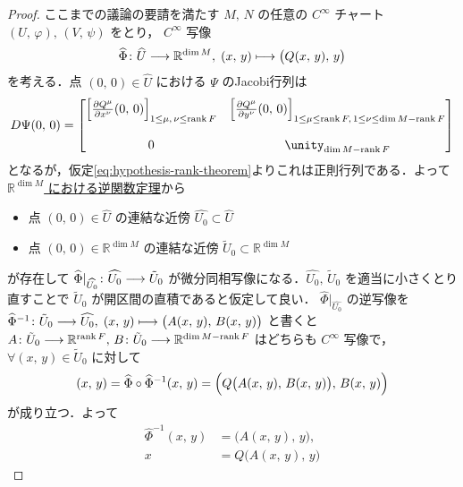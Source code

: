 \documentclass[TQFT_main]{subfiles}
\begin{document}
\begin{proof}
    ここまでの議論の要請を満たす $M,\, N$ の任意の $C^\infty$ チャート $(U,\, \varphi),\, (V,\, \psi)$ をとり， 
    $C^\infty$ 写像
    \begin{align}
        \widehat{\Phi} \colon \widehat{U} \longrightarrow \mathbb{R}^{\dim M},\; (x,\, y) \longmapsto \bigl( Q(x,\, y),\, y \bigr) 
    \end{align}
    を考える．点 $(0,\, 0) \in \widehat{U}$ における $\Psi$ のJacobi行列は
    \begin{align}
        D\Psi(0,\, 0) = 
        \mqty[
            \left[\pdv{Q^\mu}{x^\nu}()(0,\, 0)\right]_{1 \le \mu,\, \nu \le \rank F} & \left[\pdv{Q^\mu}{y^\nu}()(0,\, 0)\right]_{1 \le \mu \le \rank F,\, 1 \le \nu \le \dim M - \rank F} \\ 
            & \\
            0 & \unity_{\dim M - \rank F}
        ]
    \end{align}
    となるが，仮定\eqref{eq:hypothesis-rank-theorem}よりこれは正則行列である．よって\hyperref[thm:inverse-function-Rn]{$\mathbb{R}^{\dim M}$ における逆関数定理}から
    \begin{itemize}
        \item 点 $(0,\, 0) \in \widehat{U}$ の連結な近傍 $\widehat{U_0} \subset \widehat{U}$
        \item 点 $(0,\, 0) \in \mathbb{R}^{\dim M}$ の連結な近傍 $\tilde{U}_0 \subset \mathbb{R}^{\dim M}$
    \end{itemize}
    が存在して $\widehat{\Phi}|_{\widehat{U_0}} \colon \widehat{U_0} \longrightarrow \tilde{U}_0$ が微分同相写像になる．$\widehat{U_0},\, \tilde{U}_0$ を適当に小さくとり直すことで $\tilde{U}_0$ が開区間の直積であると仮定して良い．
    $\widehat{\Phi}|_{\widehat{U_0}}$ の逆写像を $\widehat{\Phi}^{-1} \colon \tilde{U}_0 \longrightarrow \widehat{U_0},\; (x,\, y) \longmapsto \bigl( A(x,\, y),\, B(x,\, y) \bigr)$ と書くと $A \colon \tilde{U}_0 \longrightarrow \mathbb{R}^{\rank F},\, B \colon \tilde{U}_0 \longrightarrow \mathbb{R}^{\dim M -\rank F}$ はどちらも $C^\infty$ 写像で，
    $\forall (x,\, y) \in \tilde{U}_0$ に対して
    \begin{align}
        (x,\, y) 
        = \widehat{\Phi} \circ \widehat{\Phi}^{-1}(x,\, y)
        = \Bigl( Q \bigl( A(x,\, y),\, B(x,\, y) \bigr),\, B(x,\, y)  \Bigr)
    \end{align}
    が成り立つ．よって
    \begin{align}
        \widehat{\Phi}^{-1}(x,\, y) &= \bigl( A(x,\, y),\, y \bigr) , \\
        x &= Q \bigl( A(x,\, y),\, y \bigr) 
    \end{align}

\end{proof}
\end{document}
